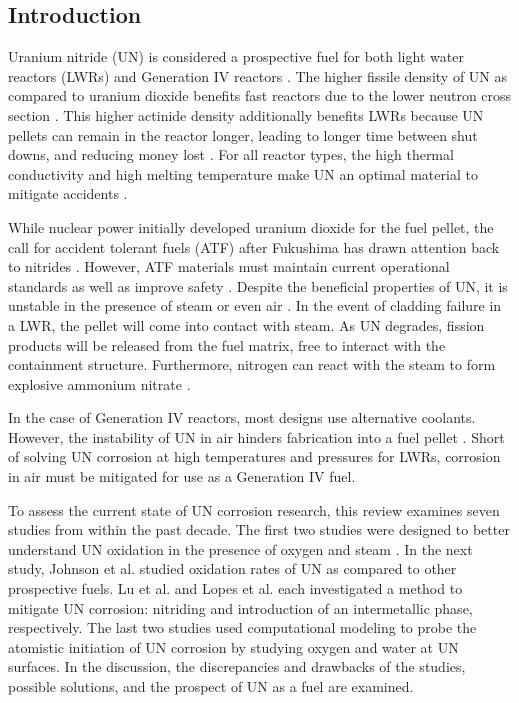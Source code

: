 \documentclass[11pt]{article}
\begin{document}
\begin{multicols}{2}


\section{Introduction}

Uranium nitride (UN) is considered a prospective fuel for both light water reactors (LWRs) and Generation IV reactors \cite{Streit2005,Mizutani1998}. The higher fissile density of UN as compared to uranium dioxide benefits fast reactors due to the lower neutron cross section \cite{Silva2009}. This higher actinide density additionally benefits LWRs because UN pellets can remain in the reactor longer, leading to longer time between shut downs, and reducing money lost \cite{Lopes2017}. For all reactor types, the high thermal conductivity and high melting temperature make UN an optimal material to mitigate accidents \cite{Lopes2017}.
\par 
While nuclear power initially developed uranium dioxide for the fuel pellet, the call for accident tolerant fuels (ATF) after Fukushima has drawn attention back to nitrides \cite{Johnson2016}. However, ATF materials must maintain current operational standards as well as improve safety \cite{Zinkle2014}. Despite the beneficial properties of UN, it is unstable in the presence of steam or even air \cite{Lopes2017,Johnson2016,Jolkkonen2017}. In the event of cladding failure in a LWR, the pellet will come into contact with steam. As UN degrades, fission products will be released from the fuel matrix, free to interact with the containment structure. Furthermore, nitrogen can react with the steam to form explosive ammonium nitrate \cite{Jolkkonen2017}.
\par 
 In the case of Generation IV reactors, most designs use alternative coolants. However, the instability of UN in air hinders fabrication into a fuel pellet \cite{Lopes2017}. Short of solving UN corrosion at high temperatures and pressures for LWRs, corrosion in air must be mitigated for use as a Generation IV fuel.
 \par 
 To assess the current state of UN corrosion research, this review examines seven studies from within the past decade. The first two studies were designed to better understand UN oxidation in the presence of oxygen \cite{Liu2013} and steam \cite{Jolkkonen2017}. In the next study, Johnson et al. \cite{Johnson2016} studied oxidation rates of UN as compared to other prospective fuels.  Lu et al. \cite{Lu2016} and Lopes et al. \cite{Lopes2017} each investigated a method to mitigate UN corrosion: nitriding and introduction of an intermetallic phase, respectively. The last two studies used computational modeling to probe the atomistic initiation of UN corrosion by studying oxygen \cite{Bocharov2013} and water \cite{Bo2016} at UN surfaces. In the discussion, the discrepancies and drawbacks of the studies, possible solutions, and the prospect of UN as a fuel are examined.


\end{multicols}
\end{document}
